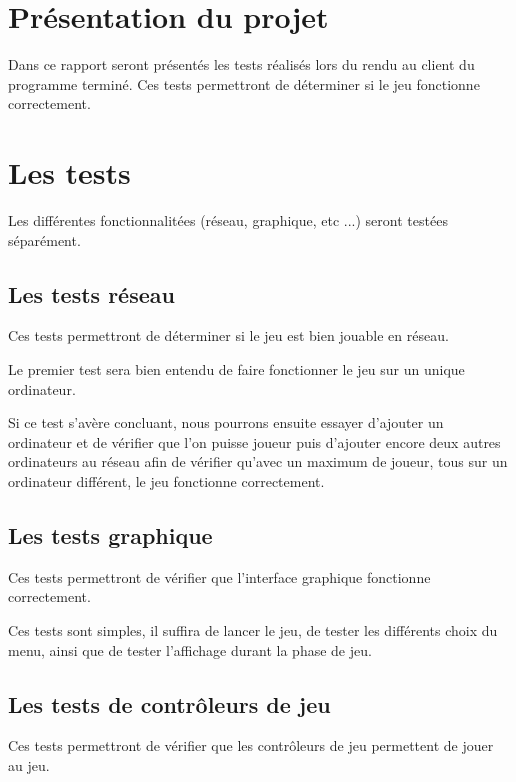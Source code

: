 \section*{Présentation du projet}


Dans ce rapport seront présentés les tests réalisés lors du rendu au client du programme terminé. Ces tests permettront de déterminer si le jeu fonctionne correctement.

\section{Les tests}

Les différentes fonctionnalitées (réseau, graphique, etc ...) seront testées séparément.

\subsection{Les tests réseau}

Ces tests permettront de déterminer si le jeu est bien jouable en réseau.

Le premier test sera bien entendu de faire fonctionner le jeu sur un unique ordinateur.

Si ce test s'avère concluant, nous pourrons ensuite essayer d'ajouter un ordinateur et de vérifier que l'on puisse joueur puis d'ajouter encore deux autres ordinateurs au réseau afin de vérifier qu'avec un maximum de joueur, tous sur un ordinateur différent, le jeu fonctionne correctement.

\subsection{Les tests graphique}

Ces tests permettront de vérifier que l'interface graphique fonctionne correctement.

Ces tests sont simples, il suffira de lancer le jeu, de tester les différents choix du menu, ainsi que de tester l'affichage durant la phase de jeu.

\subsection{Les tests de contrôleurs de jeu}

Ces tests permettront de vérifier que les contrôleurs de jeu permettent de jouer au jeu.



